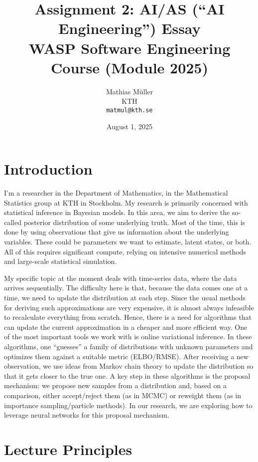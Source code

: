 \documentclass[11pt,a4paper]{article}
\title{\vspace{-0.5em}Assignment 2: AI/AS (``AI Engineering'') Essay\\
\large WASP Software Engineering Course (Module 2025)}
\author{Mathias Müller\\
\small KTH \\
\small \texttt{matmul@kth.se}}
\date{August 1, 2025}
\begin{document}
\maketitle


\section{Introduction}
I’m a researcher in the Department of Mathematics, in the Mathematical Statistics group at KTH in Stockholm. My research is primarily concerned with statistical inference in Bayesian models. In this area, we aim to derive the so-called posterior distribution of some underlying truth. Most of the time, this is done by using observations that give us information about the underlying variables. These could be parameters we want to estimate, latent states, or both. All of this requires significant compute, relying on intensive numerical methods and large-scale statistical simulation.

My specific topic at the moment deals with time-series data, where the data arrives sequentially. The difficulty here is that, because the data comes one at a time, we need to update the distribution at each step. Since the usual methods for deriving such approximations are very expensive, it is almost always infeasible to recalculate everything from scratch. Hence, there is a need for algorithms that can update the current approximation in a cheaper and more efficient way. One of the most important tools we work with is online variational inference. In these algorithms, one “guesses” a family of distributions with unknown parameters and optimizes them against a suitable metric (ELBO/RMSE). After receiving a new observation, we use ideas from Markov chain theory to update the distribution so that it gets closer to the true one. A key step in these algorithms is the proposal mechanism: we propose new samples from a distribution and, based on a comparison, either accept/reject them (as in MCMC) or reweight them (as in importance sampling/particle methods). In our research, we are exploring how to leverage neural networks for this proposal mechanism.

\section{Lecture Principles}
\end{document}
